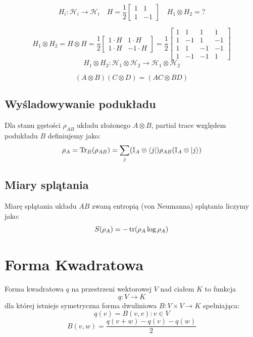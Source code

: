 \documentclass{../notatki}
\begin{document}
\begin{examplebox}
  $$
  H_i: \mathcal{H}_i \to \mathcal{H}_i \quad
  H = \frac{1}{2}
  \begin{bmatrix}
    1 & 1 \\
    1 & -1
  \end{bmatrix}
  \quad H_1 \otimes H_2 = ?
  $$

  $$
  H_1 \otimes H_2 = H \otimes H = \frac{1}{2}
  \begin{bmatrix}
    1 \cdot H & 1 \cdot H \\
    1 \cdot H & -1 \cdot H
  \end{bmatrix} = \frac{1}{2}
  \begin{bmatrix}
    1 & 1 & 1 & 1 \\
    1 & -1 & 1 & -1 \\
    1 & 1 & -1 & -1 \\
    1 & -1 & -1 & 1
  \end{bmatrix}
  $$
  $$
  H_1 \otimes H_2 : \mathcal{H}_1 \otimes \mathcal{H}_2 \to
  \mathcal{H}_1 \otimes \mathcal{H}_2
  $$
\end{examplebox}

$$
(A \otimes B)(C \otimes D) = (AC \otimes BD)
$$

\subsection{Wyśladowywanie podukładu}

Dla stanu gęstości $\rho_{AB}$ układu złożonego $A \otimes B$, partial trace
względem podukładu $B$ definiujemy jako:
$$
\rho_A = \Tr_B(\rho_{AB}) = \sum_j (\mathbb{I}_A \otimes \bra{j})
\rho_{AB} (\mathbb{I}_A \otimes \ket{j})
$$

\subsection{Miary splątania}

Miarę splątania układu $AB$ zwaną entropią (von Neumanna) splątania liczymy
jako:
$$
S(\rho_A) = -\tr(\rho_A \log \rho_A)
$$

\section{Forma Kwadratowa}

Forma kwadratowa $q$ na przestrzeni wektorowej $V$ nad ciałem $K$ to funkcja
$$
q: V \to K
$$
dla której istnieje symetryczna forma dwuliniowa $B: V \times V \to K$
spełniająca:
$$
q(v) = B(v, v) : v \in V
$$
$$
B(v, w) = \frac{q(v + w) - q(v) - q(w)}{2}
$$
\end{document}
